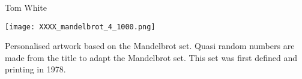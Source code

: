 \documentclass[10pt,a4paper]{article}
\begin{document}
\vspace*{\fill}
\begin{center}
Tom White
\end{center}
\vspace{1cm}
\begin{center}
\texttt{[image: XXXX\_mandelbrot\_4\_1000.png]}
\end{center}
\vspace*{\fill}

\begin{center}
\tiny
Personalised artwork based on the Mandelbrot set. Quasi random numbers are made from the title to adapt the Mandelbrot set. This set was first defined and printing in 1978.
\end{center}
\end{document}
